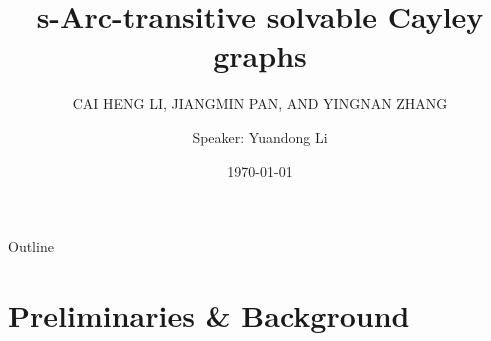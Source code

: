 \documentclass{beamer}
\begin{document}
\title{s-Arc-transitive solvable Cayley graphs}
\subtitle{CAI HENG LI, JIANGMIN PAN, AND YINGNAN ZHANG}


\author{Speaker: Yuandong Li}



\date{\today}










\begin{frame}
\titlepage
\end{frame}
\date{\crono}


\begin{frame}{Outline}
 \tableofcontents
\end{frame}



\section{Preliminaries \& Background}
\end{document}
